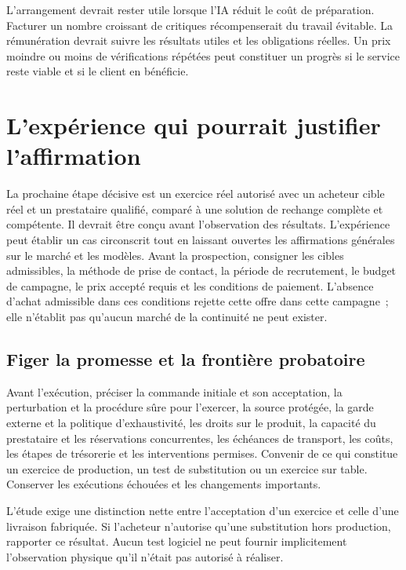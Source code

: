 \documentclass[11pt,a4paper]{article}
\begin{document}
L’arrangement devrait rester utile lorsque l’IA réduit le coût de préparation. Facturer un nombre croissant de critiques récompenserait du travail évitable. La rémunération devrait suivre les résultats utiles et les obligations réelles. Un prix moindre ou moins de vérifications répétées peut constituer un progrès si le service reste viable et si le client en bénéficie.

\section{L’expérience qui pourrait justifier l’affirmation}\label{sec:experiment}
La prochaine étape décisive est un exercice réel autorisé avec un acheteur cible réel et un prestataire qualifié, comparé à une solution de rechange complète et compétente. Il devrait être conçu avant l’observation des résultats. L’expérience peut établir un cas circonscrit tout en laissant ouvertes les affirmations générales sur le marché et les modèles. Avant la prospection, consigner les cibles admissibles, la méthode de prise de contact, la période de recrutement, le budget de campagne, le prix accepté requis et les conditions de paiement. L’absence d’achat admissible dans ces conditions rejette cette offre dans cette campagne~; elle n’établit pas qu’aucun marché de la continuité ne peut exister.

\subsection{Figer la promesse et la frontière probatoire}
Avant l’exécution, préciser la commande initiale et son acceptation, la perturbation et la procédure sûre pour l’exercer, la source protégée, la garde externe et la politique d’exhaustivité, les droits sur le produit, la capacité du prestataire et les réservations concurrentes, les échéances de transport, les coûts, les étapes de trésorerie et les interventions permises. Convenir de ce qui constitue un exercice de production, un test de substitution ou un exercice sur table. Conserver les exécutions échouées et les changements importants.

L’étude exige une distinction nette entre l’acceptation d’un exercice et celle d’une livraison fabriquée. Si l’acheteur n’autorise qu’une substitution hors production, rapporter ce résultat. Aucun test logiciel ne peut fournir implicitement l’observation physique qu’il n’était pas autorisé à réaliser.
\end{document}

